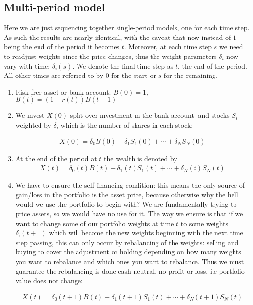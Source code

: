 \documentclass[9pt]{extarticle}
\begin{document}
\subsection{Multi-period model}

Here we are just sequencing together single-period models, one for each time step. As such the results are nearly identical, with the caveat that now 
instead of $1$ being the end of the period it becomes $t$. Moreover, at each time step $s$ we need to readjust weights since the price changes, thus 
the weight parameters $\delta_i$ now vary with time: $\delta_i(s)$. We denote the final time step as $t$, the end of the period. All other times are referred to 
by $0$ for the start or $s$ for the remaining.
\begin{enumerate}
  \item Risk-free asset or bank account: $B(0)=1$, $B(t) = (1+r(t))B(t-1)$ 
  \item We invest $X(0)$ split over investment in the bank account, and stocks $S_i$ weighted by $\delta_i$ which is the number 
  of shares in each stock:

  \begin{align}
    X(0) = \delta_0 B(0) + \delta_1 S_1(0) + \cdots + \delta_N S_N(0)
  \end{align}
  \item At the end of the period at $t$ the wealth is denoted by 
  \begin{align}
    X(t) = \delta_0(t) B(t) + \delta_1(t) S_1(t) + \cdots + \delta_N(t) S_N(t)
  \end{align}
  \item We have to ensure the self-financing condition: this means the only source of gain/loss in the portfolio is the asset price, because otherwise why the hell would we use 
  the portfolio to begin with? We are fundamentally trying to price assets, so we would have no use for it. The way we ensure is that if we want to change some of our portfolio weights
  at time $t$ to some weights $\delta_i(t+1)$ which will become the new weights beginning with the next time step passing, 
  this can only occur by rebalancing of the weights: selling and buying to cover the adjustment or holding depending on how many weights you want to rebalance and which 
  ones you want to rebalance. Thus we must guarantee the rebalancing is done cash-neutral, no profit or loss, i.e portfolio value does not change:

  \begin{align}
        X(t) = \delta_0(t+1) B(t) + \delta_1(t+1) S_1(t) + \cdots + \delta_N(t+1) S_N(t)
  \end{align}


\end{enumerate}
\end{document}
